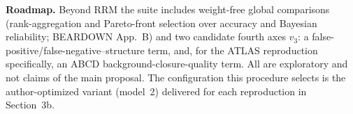 \smallskip
\noindent\textbf{Roadmap.} Beyond RRM the suite includes weight-free global comparisons (rank-aggregation and Pareto-front selection over accuracy and Bayesian reliability; BEARDOWN App.~B) and two candidate fourth axes $v_3$: a false-positive/false-negative--structure term, and, for the ATLAS reproduction specifically, an ABCD background-closure-quality term. All are exploratory and not claims of the main proposal. The configuration this procedure selects is the author-optimized variant (model~2) delivered for each reproduction in Section~3b.


